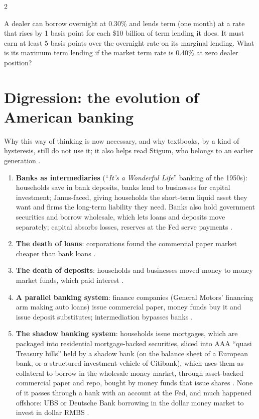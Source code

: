 \begin{paracol}{2}
\begin{exercise}
A dealer can borrow overnight at 0.30\% and lends term (one month) at a rate that rises by 1 basis point for each \$10 billion of term lending it does. It must earn at least 5 basis
points over the overnight rate on its marginal lending. What is its maximum term lending if the market term rate is 0.40\% at zero dealer position?
\end{exercise}

\section{Digression: the evolution of American banking}\label{sec:bl-evolution}

Why this way of thinking is now necessary, and why textbooks, by a kind of hysteresis, still do not use it; it also helps read Stigum, who belongs to an earlier generation
.

\begin{enumerate}
  \item \textbf{Banks as intermediaries} (``\emph{It's a Wonderful Life}'' banking of the 1950s): households save in bank deposits, banks lend to businesses for capital
        investment; Janus-faced, giving households the short-term liquid asset they want and firms the long-term liability they need. Banks also hold government securities and
        borrow wholesale, which lets loans and deposits move separately; capital absorbs losses, reserves at the Fed serve payments .
  \item \textbf{The death of loans}: corporations found the commercial paper market cheaper than bank loans .
  \item \textbf{The death of deposits}: households and businesses moved money to money market funds, which paid interest .
  \item \textbf{A parallel banking system}: finance companies (General Motors' financing arm making auto loans) issue commercial paper, money funds buy it and issue deposit
        substitutes; intermediation bypasses banks .
  \item \textbf{The shadow banking system}: households issue mortgages, which are packaged into residential mortgage-backed securities, sliced into AAA ``quasi Treasury bills''
        held by a shadow bank (on the balance sheet of a European bank, or a structured investment vehicle of Citibank), which uses them as collateral to borrow in the wholesale
        money market, through asset-backed commercial paper and repo, bought by money funds that issue shares .
        None of it passes through a bank with an account at the Fed, and much happened offshore: UBS or Deutsche Bank borrowing in the dollar money market to invest in dollar RMBS
        .
\end{enumerate}


\end{paracol}
